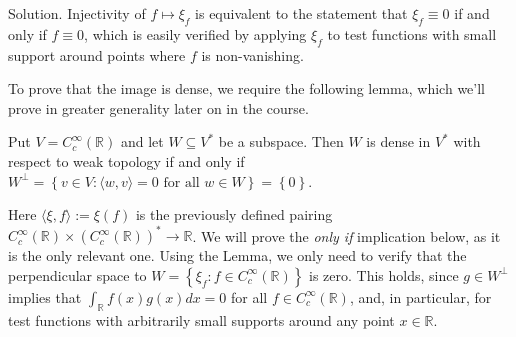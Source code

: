 \documentclass[12pt, draft,reqno,a4paper, twoside]{amsproc}
\newcommand{\dbR}{\mathbb R}
\newcommand{\gen}[1]{\langle{#1}\rangle}
\newcommand{\set}[1]{\left\{{#1}\right\}}
\newenvironment{sol}{\sc Solution. \rm}{\hfill \qedsymbol\bigskip}
\begin{document}
\begin{sol}
	Injectivity of $f\mapsto \xi_f$ is equivalent to the statement that $\xi_f\equiv 0$ if and only if $f\equiv 0$, which is easily verified by applying $\xi_f$ to test functions with small support around points where $f$ is non-vanishing. 
	
	To prove that the image is dense, we require the following lemma, which we'll prove in greater generality later on in the course.
\begin{lem}
	Put $V=C_c^\infty(\dbR)$ and let $W\subseteq V^*$ be a subspace. Then $W$ is dense in $V^*$ with respect to weak topology if and only if $W^\perp=\set{v\in V:\gen{w,v}=0\text{ for all }w\in W}=\set{0}$. 
\end{lem}

Here $\gen{\xi,f}:=\xi(f)$ is the previously defined pairing  $C_c^\infty(\dbR)\times(C_c^\infty(\dbR))^*\to \dbR$. We will prove the \textit{only if} implication below, as it is the only relevant one. Using the Lemma, we only need to verify that the perpendicular space to $W=\set{\xi_f:f\in C_c^\infty(\dbR)}$ is zero. This holds, since $g\in W^\perp$ implies that $\int_{\dbR}f(x)g(x)dx=0$ for all $f\in C_c^\infty(\dbR)$, and, in particular, for test functions with arbitrarily small supports around any point $x\in \dbR$. 


\end{sol}
\end{document}
